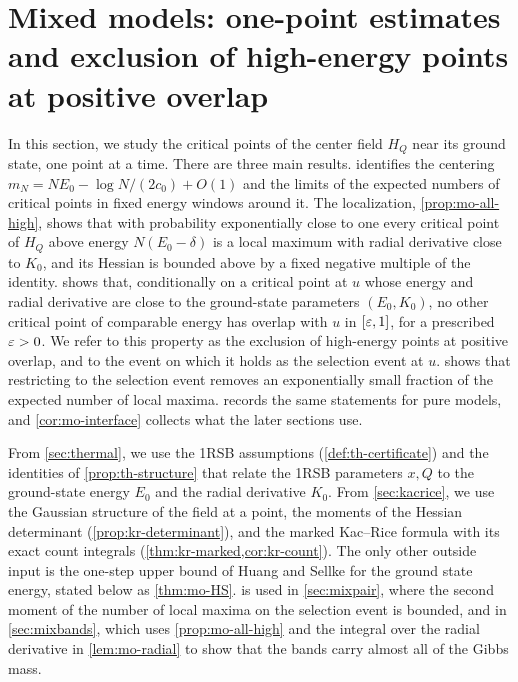 \chapter{Mixed models: one-point estimates and exclusion of high-energy points at positive overlap}\label{sec:mixone}

In this section, we study the critical points of the center field $H_Q$ near its ground state, one point at a time. There are three main results.  identifies the centering $m_N=NE_0-\log N/(2c_0)+O(1)$ and the limits of the expected numbers of critical points in fixed energy windows around it. The localization, \cref{prop:mo-all-high}, shows that with probability exponentially close to one every critical point of $H_Q$ above energy $N(E_0-\delta)$ is a local maximum with radial derivative close to $K_0$, and its Hessian is bounded above by a fixed negative multiple of the identity.  shows that, conditionally on a critical point at $u$ whose energy and radial derivative are close to the ground-state parameters $(E_0,K_0)$, no other critical point of comparable energy has overlap with $u$ in $[\varepsilon,1]$, for a prescribed $\varepsilon>0$. We refer to this property as the exclusion of high-energy points at positive overlap, and to the event on which it holds as the selection event at $u$.  shows that restricting to the selection event removes an exponentially small fraction of the expected number of local maxima.  records the same statements for pure models, and \cref{cor:mo-interface} collects what the later sections use.

From \cref{sec:thermal}, we use the 1RSB assumptions (\cref{def:th-certificate}) and the identities of \cref{prop:th-structure} that relate the 1RSB parameters $x,Q$ to the ground-state energy $E_0$ and the radial derivative $K_0$. From \cref{sec:kacrice}, we use the Gaussian structure of the field at a point, the moments of the Hessian determinant (\cref{prop:kr-determinant}), and the marked Kac--Rice formula with its exact count integrals (\cref{thm:kr-marked,cor:kr-count}). The only other outside input is the one-step upper bound of Huang and Sellke for the ground state energy, stated below as \cref{thm:mo-HS}.  is used in \cref{sec:mixpair}, where the second moment of the number of local maxima on the selection event is bounded, and in \cref{sec:mixbands}, which uses \cref{prop:mo-all-high} and the integral over the radial derivative in \cref{lem:mo-radial} to show that the bands carry almost all of the Gibbs mass.

